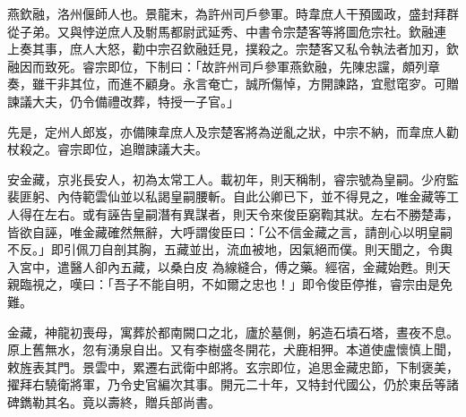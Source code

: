 \begin{pinyinscope}
 燕欽融，洛州偃師人也。景龍末，為許州司戶參軍。時韋庶人干預國政，盛封拜群從子弟。又與悖逆庶人及駙馬都尉武延秀、中書令宗楚客等將圖危宗社。欽融連
 上奏其事，庶人大怒，勸中宗召欽融廷見，撲殺之。宗楚客又私令執法者加刃，欽融因而致死。睿宗即位，下制曰：「故許州司戶參軍燕欽融，先陳忠讜，頗列章奏，雖干非其位，而進不顧身。永言奄亡，誠所傷悼，方開諫路，宜慰窀穸。可贈諫議大夫，仍令備禮改葬，特授一子官。」



 先是，定州人郎岌，亦備陳韋庶人及宗楚客將為逆亂之狀，中宗不納，而韋庶人勸杖殺之。睿宗即位，追贈諫議大夫。



 安金藏，京兆長安人，初為太常工人。載初年，則天稱制，睿宗號為皇嗣。少府監裴匪躬、內侍範雲仙並以私謁皇嗣腰斬。自此公卿已下，並不得見之，唯金藏等工人得在左右。或有誣告皇嗣潛有異謀者，則天令來俊臣窮鞫其狀。左右不勝楚毒，皆欲自誣，唯金藏確然無辭，大呼謂俊臣曰：「公不信金藏之言，請剖心以明皇嗣不反。」即引佩刀自剖其胸，五藏並出，流血被地，因氣絕而僕。則天聞之，令輿入宮中，遣醫人卻內五藏，以桑白皮
 為線縫合，傅之藥。經宿，金藏始甦。則天親臨視之，嘆曰：「吾子不能自明，不如爾之忠也！」即令俊臣停推，睿宗由是免難。



 金藏，神龍初喪母，寓葬於都南闕口之北，廬於墓側，躬造石墳石塔，晝夜不息。原上舊無水，忽有湧泉自出。又有李樹盛冬開花，犬鹿相狎。本道使盧懷慎上聞，敕旌表其門。景雲中，累遷右武衛中郎將。玄宗即位，追思金藏忠節，下制褒美，擢拜右驍衛將軍，乃令史官編次其事。開元二十年，又特封代國公，仍於東岳等諸
 碑鐫勒其名。竟以壽終，贈兵部尚書。



\end{pinyinscope}